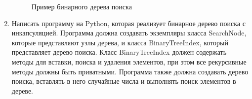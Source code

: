 \begin{enumerate}
\begin{figure}[h]
\centering
{}
\caption{Пример бинарного дерева поиска}
\end{figure}

\item Написать программу на Python, которая реализует бинарное дерево поиска с инкапсуляцией. Программа должна создавать экземпляры класса SearchNode, которые представляют узлы дерева, и класса BinaryTreeIndex, который представляет дерево поиска. Класс BinaryTreeIndex должен содержать методы для вставки, поиска и удаления элементов, при этом все рекурсивные методы должны быть приватными. Программа также должна создавать дерево поиска, вставлять в него случайные числа и выполнять поиск элементов в дереве.


\end{enumerate}
